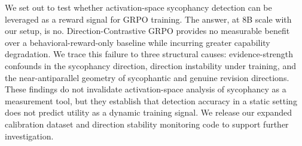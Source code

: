 \documentclass[11pt,a4paper]{article}
\begin{document}
We set out to test whether activation-space sycophancy detection can be leveraged as a reward signal for GRPO training. The answer, at 8B scale with our setup, is no. Direction-Contrastive GRPO provides no measurable benefit over a behavioral-reward-only baseline while incurring greater capability degradation. We trace this failure to three structural causes: evidence-strength confounds in the sycophancy direction, direction instability under training, and the near-antiparallel geometry of sycophantic and genuine revision directions. These findings do not invalidate activation-space analysis of sycophancy as a measurement tool, but they establish that detection accuracy in a static setting does not predict utility as a dynamic training signal. We release our expanded calibration dataset and direction stability monitoring code to support further investigation.
\end{document}

